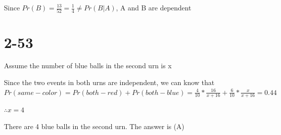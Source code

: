 \documentclass[12pt]{article}
\begin{document}
\begin{spacing}{2.0}
Since $Pr(B)=\frac{13}{52}=\frac{1}{4}\ne Pr(B|A)$, A and B are dependent

\section*{2-53}
Assume the number of blue balls in the second urn is x

Since the two events in both urns are independent, we can know that $Pr(same-color)=Pr(both-red)+Pr(both-blue)= \frac{4}{10}*\frac{16}{x+16}+\frac{6}{10}*\frac{x}{x+16}=0.44$

$\therefore x=4$

There are 4 blue balls in the second urn. The answer is (A)

\end{spacing}
\end{document}

